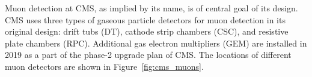 Muon detection at CMS, as implied by its name, is of central goal of its design.
CMS uses three types of gaseous particle detectors for muon detection in its original design:
drift tubs (DT), cathode strip chambers (CSC), and resistive plate chambers (RPC).
Additional gas electron multipliers (GEM) are installed in 2019 as a part of the phase-2 upgrade plan of CMS. 
The locations of different muon detectors are shown in Figure~\ref{fig:cms_muons}.




